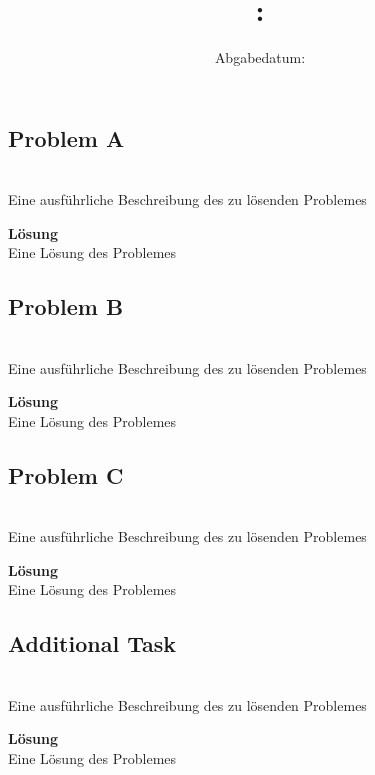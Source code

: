 \documentclass[oneside]{article}
\title{
    \textsf{\textbf{\hmwkSubject: \hmwkTitle}}
}
\author{\hmwkAuthor}
\date{Abgabedatum: \hmwkDueDate}
\begin{document}
\maketitle
\thispagestyle{firststyle}
\vspace{1cm}


\subsection*{Problem A}
\\
Eine ausführliche Beschreibung des zu lösenden Problemes

\textsf{\textbf{Lösung}}\\
Eine Lösung des Problemes

\subsection*{Problem B}
\\
Eine ausführliche Beschreibung des zu lösenden Problemes

\textsf{\textbf{Lösung}}\\
Eine Lösung des Problemes

\subsection*{Problem C}
\\
Eine ausführliche Beschreibung des zu lösenden Problemes

\textsf{\textbf{Lösung}}\\
Eine Lösung des Problemes

\subsection*{Additional Task}
\\
Eine ausführliche Beschreibung des zu lösenden Problemes

\textsf{\textbf{Lösung}}\\
Eine Lösung des Problemes


\label{LastPage}
\end{document}
